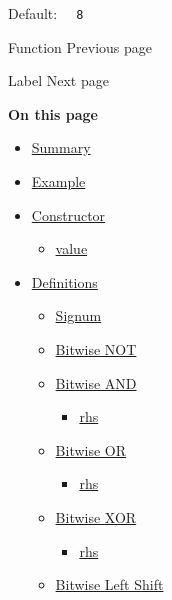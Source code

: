 Default: \texttt{\ }{\texttt{\ 8\ }}\texttt{\ }

\href{/docs/reference/foundations/function/}{\pandocbounded{}}

{ Function } { Previous page }

\href{/docs/reference/foundations/label/}{\pandocbounded{}}

{ Label } { Next page }

\textbf{On this page}

\begin{itemize}
\tightlist
\item
  \hyperref[summary]{Summary}
\item
  \hyperref[example]{Example}
\item
  \hyperref[constructor]{Constructor}

  \begin{itemize}
  \tightlist
  \item
    \hyperref[constructor-value]{value}
  \end{itemize}
\item
  \hyperref[definitions]{Definitions}

  \begin{itemize}
  \tightlist
  \item
    \hyperref[definitions-signum]{Signum}
  \item
    \hyperref[definitions-bit-not]{Bitwise NOT}
  \item
    \hyperref[definitions-bit-and]{Bitwise AND}

    \begin{itemize}
    \tightlist
    \item
      \hyperref[definitions-bit-and-rhs]{rhs}
    \end{itemize}
  \item
    \hyperref[definitions-bit-or]{Bitwise OR}

    \begin{itemize}
    \tightlist
    \item
      \hyperref[definitions-bit-or-rhs]{rhs}
    \end{itemize}
  \item
    \hyperref[definitions-bit-xor]{Bitwise XOR}

    \begin{itemize}
    \tightlist
    \item
      \hyperref[definitions-bit-xor-rhs]{rhs}
    \end{itemize}
  \item
    \hyperref[definitions-bit-lshift]{Bitwise Left Shift}


\end{itemize}
\end{itemize}

